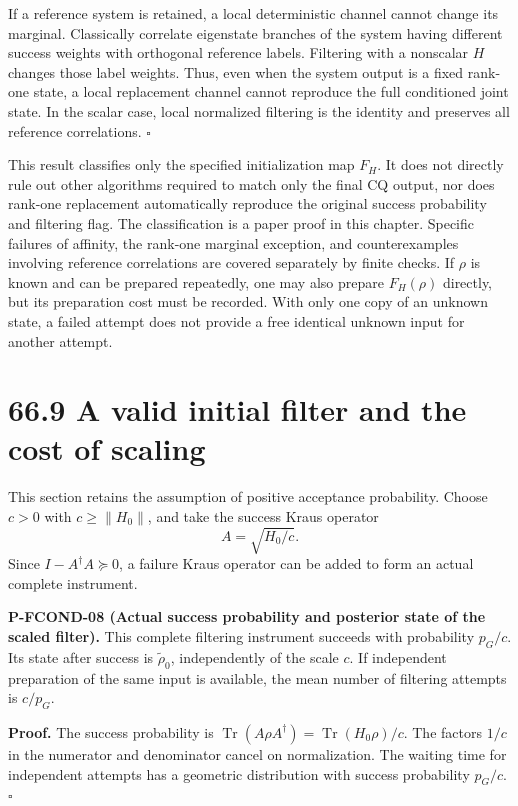\documentclass[
  11pt,
  oneside]{book}
\begin{document}
If a reference system is retained, a local deterministic channel cannot
change its marginal. Classically correlate eigenstate branches of the
system having different success weights with orthogonal reference
labels. Filtering with a nonscalar \(H\) changes those label weights.
Thus, even when the system output is a fixed rank-one state, a local
replacement channel cannot reproduce the full conditioned joint state.
In the scalar case, local normalized filtering is the identity and
preserves all reference correlations. \(\square\)

This result classifies only the specified initialization map \(F_H\). It
does not directly rule out other algorithms required to match only the
final CQ output, nor does rank-one replacement automatically reproduce
the original success probability and filtering flag. The classification
is a paper proof in this chapter. Specific failures of affinity, the
rank-one marginal exception, and counterexamples involving reference
correlations are covered separately by finite checks. If \(\rho\) is
known and can be prepared repeatedly, one may also prepare \(F_H(\rho)\)
directly, but its preparation cost must be recorded. With only one copy
of an unknown state, a failed attempt does not provide a free identical
unknown input for another attempt.

\section{66.9 A valid initial filter and the cost of scaling}

This section retains the assumption of positive acceptance probability.
Choose \(c>0\) with \(c\ge\|H_0\|\), and take the success Kraus operator
\[
A=\sqrt{H_0/c}.
\] Since \(I-A^{\dagger}A\succeq0\), a failure Kraus operator can be
added to form an actual complete instrument.

\label{p-fcond-08}{} \textbf{P-FCOND-08 (Actual success
probability and posterior state of the scaled filter).} This complete
filtering instrument succeeds with probability \(p_G/c\). Its state
after success is \(\widetilde\rho_0\), independently of the scale \(c\).
If independent preparation of the same input is available, the mean
number of filtering attempts is \(c/p_G\).

\textbf{Proof.} The success probability is
\(\operatorname{Tr}(A\rho A^{\dagger})=\operatorname{Tr}(H_0\rho)/c\).
The factors \(1/c\) in the numerator and denominator cancel on
normalization. The waiting time for independent attempts has a geometric
distribution with success probability \(p_G/c\). \(\square\)
\end{document}
